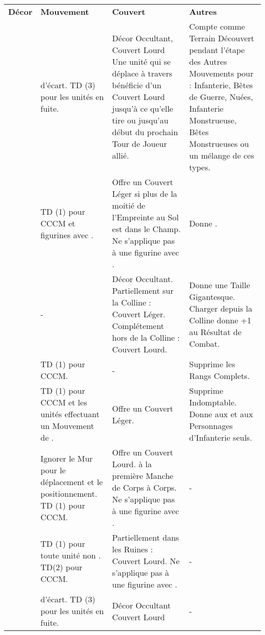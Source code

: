 {\vspace*{-5pt}
\begin{center}
\begin{tabular}{@{}>{\bfseries}M{2cm}M{3.8cm}M{5.3cm}M{5.3cm}}
\textbf{Décor} & \textbf{Mouvement} & \textbf{Couvert} & \textbf{Autres} \tabularnewline
{} &
 d'écart.\newline
TD (3) pour les unités en fuite. &
Décor Occultant, Couvert Lourd\newline
Une unité qui se déplace à travers bénéficie d'un Couvert Lourd jusqu'à ce qu'elle tire ou jusqu'au début du prochain Tour de Joueur allié. &
Compte comme Terrain Découvert pendant l'étape des Autres Mouvements pour : Infanterie, Bêtes de Guerre, Nuées, Infanterie Monstrueuse, Bêtes Monstrueuses ou un mélange de ces types. \tabularnewline
{} &
TD (1) pour CCCM et figurines avec \flamingattacks{}. &
Offre un Couvert Léger si plus de la moitié de l'Empreinte au Sol est dans le Champ. Ne s'applique pas à une figurine avec \toweringpresence{}. &
Donne \flammable{}. \tabularnewline
{} &
- &
Décor Occultant.\newline
Partiellement sur la Colline : Couvert Léger.\newline
Complétement hors de la Colline : Couvert Lourd.&
Donne une Taille Gigantesque.\newline
Charger depuis la Colline donne +1 au Résultat de Combat. \tabularnewline
{} &
TD (1) pour CCCM. &
- &
Supprime les Rangs Complets.\tabularnewline
{} &
TD (1) pour CCCM et les unités effectuant un Mouvement de \fly{}. &
Offre un Couvert Léger. &
Supprime Indomptable. Donne \stubborn{} aux \skirmishers{} et aux Personnages d'Infanterie seuls.\tabularnewline
{} &
Ignorer le Mur pour le déplacement et le positionnement. TD (1) pour CCCM. &
Offre un Couvert Lourd. \distracting{} à la première Manche de Corps à Corps. Ne s'applique pas à une figurine avec \toweringpresence{}. &
- \tabularnewline
{} &
TD (1) pour toute unité non \skirmisher{}. TD(2) pour CCCM. &
Partiellement dans les Ruines : Couvert Lourd. Ne s'applique pas à une figurine avec \toweringpresence{}. &
- \tabularnewline
{} &
 d'écart.\newline
TD (3) pour les unités en fuite. &
Décor Occultant\newline
Couvert Lourd &
- \tabularnewline
\end{tabular}
\end{center}

}
